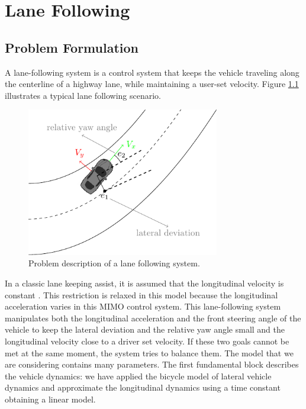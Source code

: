 \chapter{Lane Following}
\section{Problem Formulation}
A lane-following system is a control system that keeps the vehicle traveling along the centerline of a highway lane, while maintaining a user-set velocity. Figure \ref{fig:laneFollowing} illustrates a typical lane following scenario.
\begin{figure}[!h]
	\centering
	\includegraphics[width=0.75\textwidth]{../figure/laneFollowing/laneFollowing.pdf}
	\caption{Problem description of a lane following system.}
	\label{fig:laneFollowing}
\end{figure}

In a classic lane keeping assist, it is assumed that the longitudinal velocity is constant \cite{Adaptive_Mpc_Lane_keeping_borelli}. This restriction is relaxed in this model because the longitudinal acceleration varies in this MIMO control system. This lane-following system manipulates both the longitudinal acceleration and the front steering angle of the vehicle to keep the lateral deviation and the relative yaw angle small and the longitudinal velocity close to a driver set velocity. If these two goals cannot be met at the same moment, the system tries to balance them. The model that we are considering contains many parameters. The first fundamental block describes the vehicle dynamics: we have applied the bicycle model of lateral vehicle dynamics and approximate the longitudinal dynamics using a time constant obtaining  a linear model.
